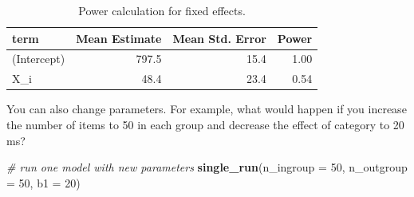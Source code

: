\documentclass[
  english,
  doc,floatsintext]{apa6}
\newenvironment{Shaded}{\begin{snugshade}}{\end{snugshade}}
\newcommand{\CommentTok}[1]{\textcolor[rgb]{0.56,0.35,0.01}{\textit{#1}}}
\newcommand{\DataTypeTok}[1]{\textcolor[rgb]{0.13,0.29,0.53}{#1}}
\newcommand{\DecValTok}[1]{\textcolor[rgb]{0.00,0.00,0.81}{#1}}
\newcommand{\KeywordTok}[1]{\textcolor[rgb]{0.13,0.29,0.53}{\textbf{#1}}}
\newcommand{\NormalTok}[1]{#1}
\begin{document}
\begin{table}[H]

\begin{center}
\begin{threeparttable}

\caption{\label{tab:calc-power-table}Power calculation for fixed effects.}

\begin{tabular}{lrrr}
\toprule
term & \multicolumn{1}{c}{Mean Estimate} & \multicolumn{1}{c}{Mean Std. Error} & \multicolumn{1}{c}{Power}\\
\midrule
(Intercept) & 797.5 & 15.4 & 1.00\\
X\_i & 48.4 & 23.4 & 0.54\\
\bottomrule
\end{tabular}

\end{threeparttable}
\end{center}

\end{table}

You can also change parameters. For example, what would happen if you increase the number of items to 50 in each group and decrease the effect of category to 20 ms?

\begin{Shaded}
\begin{Highlighting}[]
\CommentTok{# run one model with new parameters}
\KeywordTok{single_run}\NormalTok{(}\DataTypeTok{n_ingroup =} \DecValTok{50}\NormalTok{, }\DataTypeTok{n_outgroup =} \DecValTok{50}\NormalTok{, }\DataTypeTok{b1 =} \DecValTok{20}\NormalTok{)}
\end{Highlighting}
\end{Shaded}
\end{document}
